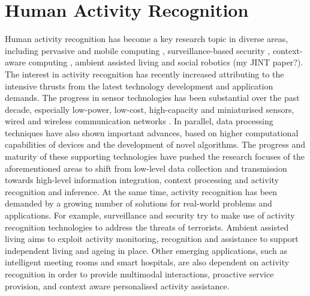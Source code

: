 \section{Human Activity Recognition}
\label{sec:soa:har}


Human activity recognition has become a key research topic in diverse areas, including pervasive and mobile computing \cite{Weiser1991} \cite{Choudhury2008}, surveillance-based security \cite{Poppe2010} \cite{Akdemir2008} \cite{Weinland2011}, context-aware computing \cite{Laerhoven2001} \cite{Wren2006}, ambient assisted living \cite{Philipose2004} \cite{Cook2009} \cite{Kasteren2008} \cite{Chen2012a} and social robotics \cite{Fong2003a} (my JINT paper?). The interest in activity recognition has recently increased attributing to the intensive thrusts from the latest technology development and application demands. The progress in sensor technologies has been substantial over the past decade, especially low-power, low-cost, high-capacity and miniaturised sensors, wired and wireless communication networks \cite{Pantelopoulos2010} \cite{Alemdar2010} \cite{Ding2011}. In parallel, data processing techniques have also shown important advances, based on higher computational capabilities of devices and the development of novel algorithms. The progress and maturity of these supporting technologies have pushed the research focuses of the aforementioned areas to shift from low-level data collection and transmission towards high-level information integration, context processing and activity recognition and inference. At the same time, activity recognition has been demanded by a growing number of solutions for real-world problems and applications. For example, surveillance and security try to make use of activity recognition technologies to address the threats of terrorists. Ambient assisted living aims to exploit activity monitoring, recognition and assistance to support independent living and ageing in place. Other emerging applications, such as intelligent meeting rooms and smart hospitals, are also dependent on activity recognition in order to provide multimodal interactions, proactive service provision, and context aware personalised activity assistance. 

